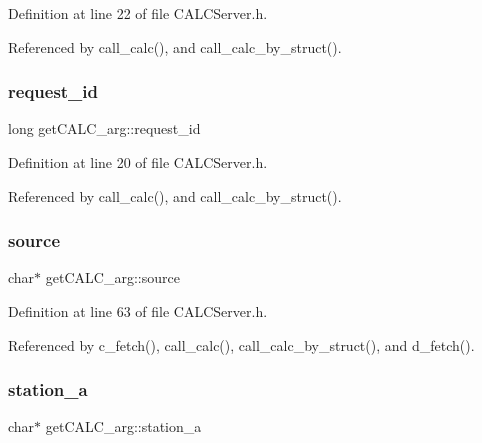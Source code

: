 Definition at line 22 of file C\+A\+L\+C\+Server.\+h.



Referenced by call\+\_\+calc(), and call\+\_\+calc\+\_\+by\+\_\+struct().

\mbox{\label{structget_c_a_l_c__arg_a23eb9d0da489d4f8c9a10ae72d34bd7b}} 
\subsubsection{\texorpdfstring{request\+\_\+id}{request\_id}}
{\footnotesize\ttfamily long get\+C\+A\+L\+C\+\_\+arg\+::request\+\_\+id}



Definition at line 20 of file C\+A\+L\+C\+Server.\+h.



Referenced by call\+\_\+calc(), and call\+\_\+calc\+\_\+by\+\_\+struct().

\mbox{\label{structget_c_a_l_c__arg_ab843028117e16b082c1b3ec9540b68c6}} 
\subsubsection{\texorpdfstring{source}{source}}
{\footnotesize\ttfamily char$\ast$ get\+C\+A\+L\+C\+\_\+arg\+::source}



Definition at line 63 of file C\+A\+L\+C\+Server.\+h.



Referenced by c\+\_\+fetch(), call\+\_\+calc(), call\+\_\+calc\+\_\+by\+\_\+struct(), and d\+\_\+fetch().

\mbox{\label{structget_c_a_l_c__arg_ab70251b92c492b032fb0071c6fc1fd2c}} 
\subsubsection{\texorpdfstring{station\+\_\+a}{station\_a}}
{\footnotesize\ttfamily char$\ast$ get\+C\+A\+L\+C\+\_\+arg\+::station\+\_\+a}



